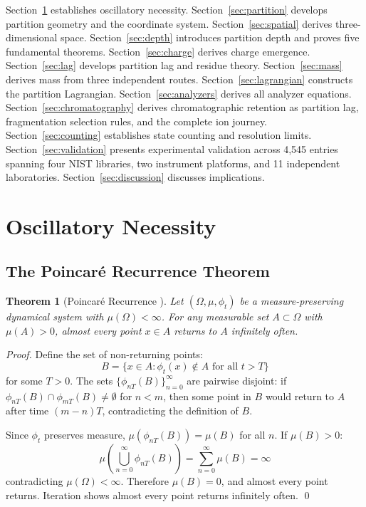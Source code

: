 \documentclass[twocolumn,10pt,a4paper]{article}
\newtheorem{theorem}{Theorem}[section]
\theoremstyle{definition}
\theoremstyle{remark}
\begin{document}
Section~\ref{sec:oscillatory} establishes oscillatory necessity. Section~\ref{sec:partition} develops partition geometry and the coordinate system. Section~\ref{sec:spatial} derives three-dimensional space. Section~\ref{sec:depth} introduces partition depth and proves five fundamental theorems. Section~\ref{sec:charge} derives charge emergence. Section~\ref{sec:lag} develops partition lag and residue theory. Section~\ref{sec:mass} derives mass from three independent routes. Section~\ref{sec:lagrangian} constructs the partition Lagrangian. Section~\ref{sec:analyzers} derives all analyzer equations. Section~\ref{sec:chromatography} derives chromatographic retention as partition lag, fragmentation selection rules, and the complete ion journey. Section~\ref{sec:counting} establishes state counting and resolution limits. Section~\ref{sec:validation} presents experimental validation across 4,545 entries spanning four NIST libraries, two instrument platforms, and 11 independent laboratories. Section~\ref{sec:discussion} discusses implications.

\section{Oscillatory Necessity}
\label{sec:oscillatory}

\subsection{The Poincar\'{e} Recurrence Theorem}

\begin{theorem}[Poincar\'{e} Recurrence \citep{poincare1890}]
\label{thm:poincare}
Let $(\Omega, \mu, \phi_t)$ be a measure-preserving dynamical system with $\mu(\Omega) < \infty$. For any measurable set $A \subset \Omega$ with $\mu(A) > 0$, almost every point $x \in A$ returns to $A$ infinitely often.
\end{theorem}

\begin{proof}
Define the set of non-returning points:
\begin{equation}
    B = \{x \in A : \phi_t(x) \notin A \text{ for all } t > T\}
\end{equation}
for some $T > 0$. The sets $\{\phi_{nT}(B)\}_{n=0}^\infty$ are pairwise disjoint: if $\phi_{nT}(B) \cap \phi_{mT}(B) \neq \emptyset$ for $n < m$, then some point in $B$ would return to $A$ after time $(m-n)T$, contradicting the definition of $B$.

Since $\phi_t$ preserves measure, $\mu(\phi_{nT}(B)) = \mu(B)$ for all $n$. If $\mu(B) > 0$:
\begin{equation}
    \mu\left(\bigcup_{n=0}^\infty \phi_{nT}(B)\right) = \sum_{n=0}^\infty \mu(B) = \infty
\end{equation}
contradicting $\mu(\Omega) < \infty$. Therefore $\mu(B) = 0$, and almost every point returns. Iteration shows almost every point returns infinitely often. \qed
\end{proof}
\end{document}
